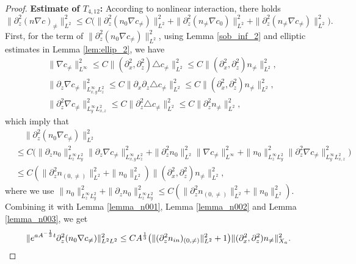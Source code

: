 \documentclass[12pt, reqno]{amsart}
\numberwithin{equation}{section}
\begin{document}
\begin{proof}
		\noindent\textbf{Estimate of $T_{4,12}$:}
		According to nonlinear interaction, there holds 
		\begin{equation*}
			\|\partial_z^2(n\nabla c)_{\neq}\|^2_{L^2}\leq C
			\big(\|\partial_z^2(n_0\nabla c_{\neq})\|^2_{L^2}+
			\|\partial_z^2(n_{\neq}\nabla c_{0})\|^2_{L^2}+
			\|\partial_z^2(n_{\neq}\nabla c_{\neq})\|^2_{L^2}\big).
		\end{equation*}
		First, for the term of $\|\partial_z^2(n_0\nabla c_{\neq})\|^2_{L^2}$,
		using  Lemma \ref{sob_inf_2} and elliptic estimates in Lemma \ref{lem:ellip_2}, we have
		\begin{equation}\label{c_temp1}
			\begin{aligned}
				&\|\nabla c_{\neq}\|^2_{L^{\infty}}
				\leq C\|(\partial_x^2,\partial_z^2)\triangle c_{\neq}\|^2_{L^{2}}
				\leq C\|(\partial_x^2,\partial_z^2)n_{\neq}\|^2_{L^{2}},\\
				&\|\partial_z\nabla c_{\neq}\|^2_{L^{\infty}_{x,y}L^2_z}
				\leq C\|\partial_x\partial_z\triangle c_{\neq}\|^2_{L^{2}}
				\leq C\|(\partial_x^2,\partial_z^2)n_{\neq}\|^2_{L^{2}},\\
				&\|\partial_z^2\nabla c_{\neq}\|^2_{L^{\infty}_{y}L^2_{x,z}}
				\leq C\|\partial_z^2\triangle c_{\neq}\|^2_{L^{2}}
				\leq C\|\partial_z^2n_{\neq}\|^2_{L^{2}},
			\end{aligned}
		\end{equation}
		which imply that  
		\begin{equation*}
			\begin{aligned}
				&\quad\|\partial_z^2(n_0\nabla c_{\neq})\|^2_{L^2}\\
				&\leq C\big(\|\partial_zn_0\|^2_{L^{\infty}_{z}L^2_{y}}
				\|\partial_z\nabla c_{\neq}\|^2_{L^{\infty}_{x,y}L^2_{z}}
				+\|\partial_z^2n_{0}\|^2_{L^2}
				\|\nabla c_{\neq}\|^2_{L^{\infty}}
				+\|n_0\|^2_{L^{\infty}_{z}L^2_{y}}
				\|\partial_z^2\nabla c_{\neq}\|^2_{L^{\infty}_{y}L^2_{x,z}}
				\big)\\
				&\leq C(\|\partial_z^2n_{(0,\neq)}\|^2_{L^2}+
				\|n_{0}\|^2_{L^2})
				\|(\partial_x^2,\partial_z^2)n_{\neq}\|^2_{L^{2}},
			\end{aligned}
		\end{equation*}
		where we use $\|n_0\|^2_{L^{\infty}_{z}L^2_{y}}+\|\partial_zn_0\|^2_{L^{\infty}_{z}L^2_{y}}
		\leq C(\|\partial_z^2n_{(0,\neq)}\|^2_{L^2}+
		\|n_{0}\|^2_{L^2}).$
		Combining it with Lemma \ref{lemma_n001}, Lemma \ref{lemma_n002} and Lemma \ref{lemma_n003},  we get
		\begin{equation*}
			\begin{aligned}
				\|{\rm e}^{aA^{-\frac{1}{3}}t}
				\partial_z^2(n_0\nabla c_{\neq})\|^2_{L^2L^2}\leq 
				CA^{\frac13}\big(\|(\partial_z^2n_{\rm in})_{(0,\neq)}\|_{L^2}^2
				+1\big)
				\|(\partial_x^2,\partial_z^2)n_{\neq}\|^2_{X_a}.
			\end{aligned}
		\end{equation*}
		

\end{proof}
\end{document}
